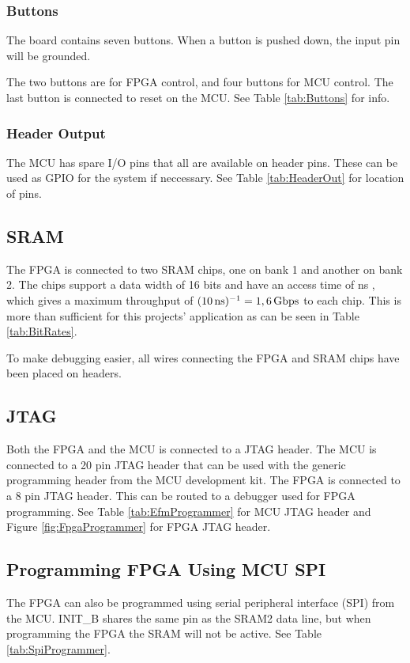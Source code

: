 \subsubsection{Buttons}
The board contains seven buttons.
When a button is pushed down, the input pin will be grounded.

The two buttons are for FPGA control, and four buttons for MCU control.
The last button is connected to reset on the MCU.
See Table \ref{tab:Buttons} for info.

\subsubsection{Header Output}
The MCU has spare I/O pins that all are available on header pins.
These can be used as GPIO for the system if neccessary.
See Table \ref{tab:HeaderOut} for location of pins.

\subsection{SRAM}
\label{subsec:sram}
The FPGA is connected to two SRAM chips, one on bank 1 and another on bank 2.
The chips support a data width of 16 bits and have an access time of \unit[10]{ns} \cite{sramdatasheet}, which gives a maximum throughput of $(\unit[10]{ns})^{-1} = \unit[1,6]{Gbps}$ to each chip.
This is more than sufficient for this projects' application as can be seen in Table \ref{tab:BitRates}.

To make debugging easier, all wires connecting the FPGA and SRAM chips have been placed on headers.

\subsection{JTAG}
Both the FPGA and the MCU is connected to a JTAG header.
The MCU is connected to a 20 pin JTAG header that can be used with the generic programming header from the MCU development kit.
The FPGA is connected to a 8 pin JTAG header.
This can be routed to a debugger used for FPGA programming.
See Table \ref{tab:EfmProgrammer} for MCU JTAG header and Figure \ref{fig:FpgaProgrammer} for FPGA JTAG header.

\subsection{Programming FPGA Using MCU SPI}
The FPGA can also be programmed using serial peripheral interface (SPI) from the MCU.
INIT\_B shares the same pin as the SRAM2 data line, but when programming the FPGA the SRAM will not be active.
See Table \ref{tab:SpiProgrammer}.

